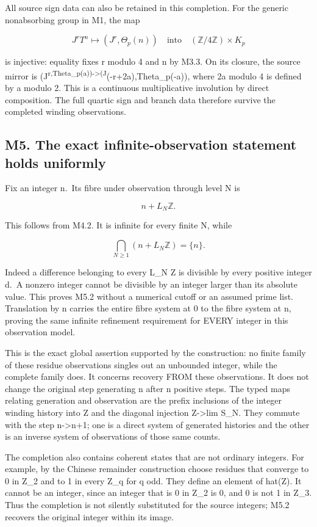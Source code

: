 \documentclass[
]{article}
\begin{document}
All source sign data can also be retained in this completion. For the
generic nonabsorbing group in M1, the map

\[
J^rT^n\longmapsto(J^r,\Theta_p(n))
\quad\text{into}\quad (\mathbb Z/4\mathbb Z)\times K_p
\tag{M4.3}
\]

is injective: equality fixes r modulo 4 and n by M3.3. On its closure,
the source mirror is
(J\textsuperscript{r,Theta\_p(a))-\textgreater(J}(-r+2a),Theta\_p(-a)),
where 2a modulo 4 is defined by a modulo 2. This is a continuous
multiplicative involution by direct composition. The full quartic sign
and branch data therefore survive the completed winding observations.

\subsection{M5. The exact infinite-observation statement holds
uniformly}\label{m5.-the-exact-infinite-observation-statement-holds-uniformly}

Fix an integer n.~Its fibre under observation through level N is

\[
n+L_N\mathbb Z.
\tag{M5.1}
\]

This follows from M4.2. It is infinite for every finite N, while

\[
\bigcap_{N\ge1}(n+L_N\mathbb Z)=\{n\}.
\tag{M5.2}
\]

Indeed a difference belonging to every L\_N Z is divisible by every
positive integer d.~A nonzero integer cannot be divisible by an integer
larger than its absolute value. This proves M5.2 without a numerical
cutoff or an assumed prime list. Translation by n carries the entire
fibre system at 0 to the fibre system at n, proving the same infinite
refinement requirement for EVERY integer in this observation model.

This is the exact global assertion supported by the construction: no
finite family of these residue observations singles out an unbounded
integer, while the complete family does. It concerns recovery FROM these
observations. It does not change the original step generating n after n
positive steps. The typed maps relating generation and observation are
the prefix inclusions of the integer winding history into Z and the
diagonal injection Z-\textgreater lim S\_N. They commute with the step
n-\textgreater n+1; one is a direct system of generated histories and
the other is an inverse system of observations of those same counts.

The completion also contains coherent states that are not ordinary
integers. For example, by the Chinese remainder construction choose
residues that converge to 0 in Z\_2 and to 1 in every Z\_q for q odd.
They define an element of hat(Z). It cannot be an integer, since an
integer that is 0 in Z\_2 is 0, and 0 is not 1 in Z\_3. Thus the
completion is not silently substituted for the source integers; M5.2
recovers the original integer within its image.
\end{document}
